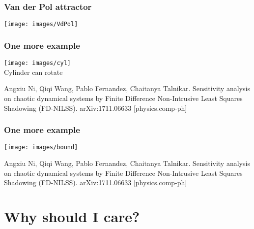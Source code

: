 \documentclass{beamer}
\begin{document}
\begin{frame}
  \frametitle{Van der Pol attractor}
  \begin{center}


  \texttt{[image: images/VdPol]}


\end{center}
\end{frame}

\begin{frame}
  \frametitle{One more example}
  \begin{center}


  \texttt{[image: images/cyl]}\\

  Cylinder can rotate\\

\end{center}

\tiny{Angxiu Ni, Qiqi Wang, Pablo Fernandez, Chaitanya Talnikar. Sensitivity analysis on chaotic dynamical systems by Finite Difference Non-Intrusive Least Squares Shadowing (FD-NILSS).	arXiv:1711.06633 [physics.comp-ph]}
\end{frame}

\begin{frame}
  \frametitle{One more example}
  \begin{center}


  \texttt{[image: images/bound]}\\


\end{center}

\tiny{Angxiu Ni, Qiqi Wang, Pablo Fernandez, Chaitanya Talnikar. Sensitivity analysis on chaotic dynamical systems by Finite Difference Non-Intrusive Least Squares Shadowing (FD-NILSS).	arXiv:1711.06633 [physics.comp-ph]}
\end{frame}

\section{Why should I care?}
\end{document}
